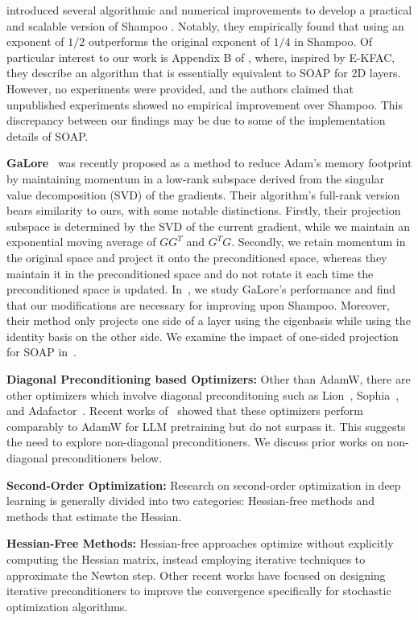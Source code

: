 \documentclass{article} %
\begin{document}
\citet{anil2020scalable} introduced several algorithmic and numerical improvements to 
develop a practical and scalable version of Shampoo \citep{shampoo}. Notably, they 
empirically found that using an exponent of $1/2$ outperforms the original exponent 
of $1/4$ in Shampoo. Of particular interest to our work is Appendix B of 
\citet{anil2020scalable}, where, inspired by E-KFAC, they describe an algorithm that 
is essentially equivalent to SOAP for 2D layers. However, no experiments were 
provided, and the authors claimed that unpublished experiments showed no empirical 
improvement over Shampoo. This discrepancy between our findings may be due to some of the implementation details of SOAP.

\textbf{GaLore}~\citep{galore} was recently proposed as a method to reduce Adam's memory footprint by 
maintaining momentum in a low-rank subspace derived from the singular value 
decomposition (SVD) of the gradients. Their algorithm’s full-rank version bears 
similarity to ours, with some notable distinctions. Firstly, their projection subspace is 
determined by the SVD of the current gradient, while we maintain an exponential moving 
average of $GG^T$ and $G^TG$. Secondly, we retain momentum in the original space and 
project it onto the preconditioned space, whereas they maintain it in the preconditioned 
space and do not rotate it each time the preconditioned space is updated. In~, we study GaLore's performance and find that our modifications are necessary for improving upon Shampoo. Moreover, their method 
only projects one side of a layer using the eigenbasis while using the identity basis on the other side. We examine the impact of one-sided 
projection for SOAP in~.


\textbf{Diagonal Preconditioning based Optimizers:} Other than AdamW, there are other optimizers which involve diagonal preconditoning such as Lion~\citep{lion}, Sophia~\citep{liu2024sophia}, and Adafactor~\citep{adafactor}. Recent works of~\citet{KaddourKNMK23,zhaoscience} showed that these optimizers perform comparably to AdamW for LLM pretraining but do not surpass it. This suggests the need to explore non-diagonal preconditioners. We discuss prior works on non-diagonal preconditioners below.

\textbf{Second-Order Optimization:} Research on second-order optimization in deep 
learning is generally divided into two categories: Hessian-free methods and methods 
that estimate the Hessian.

\textbf{Hessian-Free Methods:} Hessian-free approaches \citep{martens10, martens15} 
optimize without explicitly computing the Hessian matrix, instead employing iterative 
techniques to approximate the Newton step. Other recent works \citep{li18psgd, 
	li2024stochastichessianfittingslie, pooladzandi2024curvatureinformed} have focused on 
designing iterative preconditioners to improve the convergence specifically for stochastic
optimization algorithms.
\end{document}
